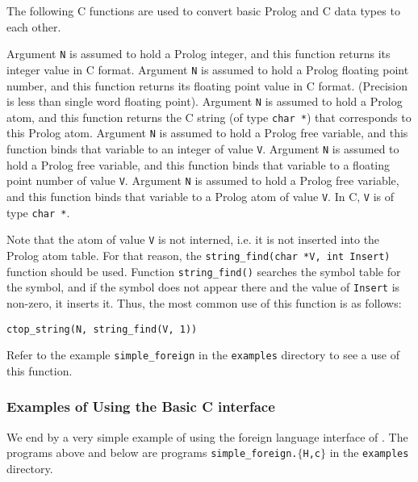 The following C functions are used to convert basic Prolog and C data types
to each other.
\begin{description}
        Argument {\tt N} is assumed to hold a Prolog integer, and this
        function returns its integer value in C format.
        Argument {\tt N} is assumed to hold a Prolog floating point number,
        and this function returns its floating point value in C format.
        (Precision is less than single word floating point).
        Argument {\tt N} is assumed to hold a Prolog atom, and this
        function returns the C string (of type {\tt char *}) that 
        corresponds to this Prolog atom.
        Argument {\tt N} is assumed to hold a Prolog free variable, and
        this function binds that variable to an integer of value {\tt V}.
        Argument {\tt N} is assumed to hold a Prolog free variable, and
        this function binds that variable to a floating point number of 
        value {\tt V}.
        Argument {\tt N} is assumed to hold a Prolog free variable, and
        this function binds that variable to a Prolog atom of value {\tt V}.
        In C, {\tt V} is of type {\tt char *}.

        Note that the atom of value {\tt V} is not interned, i.e. it is 
        not inserted into the Prolog atom table.  For that reason, the
        {\tt string\_find(char *V, int Insert)} function should be used.
        Function {\tt string\_find()} searches the symbol table for
        the symbol, and if the symbol does not appear there and the
        value of {\tt Insert} is non-zero, it inserts it.  Thus, the most
        common use of this function is as follows:
        \begin{center}
        {\tt    ctop\_string(N, string\_find(V, 1))     }
        \end{center}
        Refer to the example {\tt simple\_foreign} in the {\tt examples}
        directory to see a use of this function.
\end{description}

\subsubsection*{Examples of Using the Basic C interface}

We end by a very simple example of using the foreign language
interface of \ourprolog.  The programs above and below are programs
{\tt simple\_foreign.$\{$H,c$\}$} in the {\tt examples} directory.

